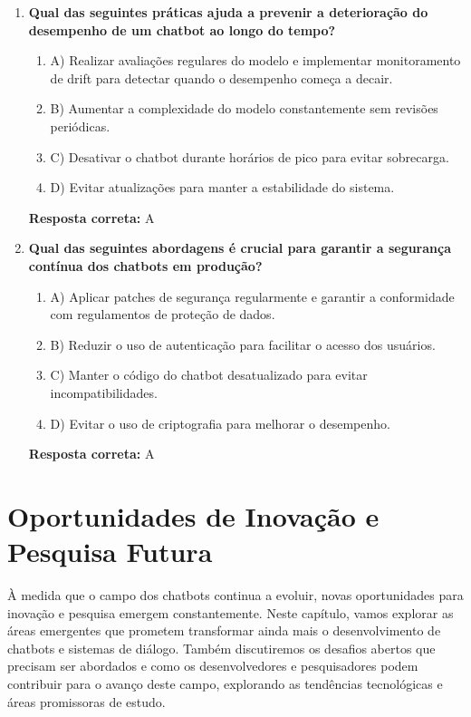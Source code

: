 \documentclass[14pt,a4paper,oneside]{book}
\begin{document}
\begin{enumerate}
	\item \textbf{Qual das seguintes práticas ajuda a prevenir a deterioração do desempenho de um chatbot ao longo do tempo?}
	\begin{enumerate}[label=\alph*)]
		\item A) Realizar avaliações regulares do modelo e implementar monitoramento de drift para detectar quando o desempenho começa a decair.
		\item B) Aumentar a complexidade do modelo constantemente sem revisões periódicas.
		\item C) Desativar o chatbot durante horários de pico para evitar sobrecarga.
		\item D) Evitar atualizações para manter a estabilidade do sistema.
	\end{enumerate}
	\vspace{5mm}
	\textbf{Resposta correta:} A
	
	\item \textbf{Qual das seguintes abordagens é crucial para garantir a segurança contínua dos chatbots em produção?}
	\begin{enumerate}[label=\alph*)]
		\item A) Aplicar patches de segurança regularmente e garantir a conformidade com regulamentos de proteção de dados.
		\item B) Reduzir o uso de autenticação para facilitar o acesso dos usuários.
		\item C) Manter o código do chatbot desatualizado para evitar incompatibilidades.
		\item D) Evitar o uso de criptografia para melhorar o desempenho.
	\end{enumerate}
	\vspace{5mm}
	\textbf{Resposta correta:} A
	
\end{enumerate}


\chapter{Oportunidades de Inovação e Pesquisa Futura}

À medida que o campo dos chatbots continua a evoluir, novas oportunidades para inovação e pesquisa emergem constantemente. Neste capítulo, vamos explorar as áreas emergentes que prometem transformar ainda mais o desenvolvimento de chatbots e sistemas de diálogo. Também discutiremos os desafios abertos que precisam ser abordados e como os desenvolvedores e pesquisadores podem contribuir para o avanço deste campo, explorando as tendências tecnológicas e áreas promissoras de estudo.
\end{document}

